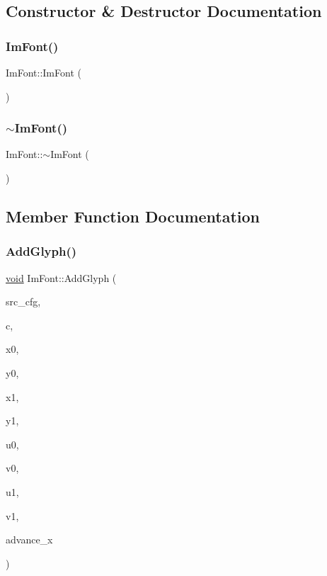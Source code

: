 \subsection{Constructor \& Destructor Documentation}
\mbox{\label{structImFont_a1d35b1eb7c2f6a3a648308531e88e7f1}} 
\subsubsection{\texorpdfstring{Im\+Font()}{ImFont()}}
{\footnotesize\ttfamily Im\+Font\+::\+Im\+Font (\begin{DoxyParamCaption}{ }\end{DoxyParamCaption})}

\mbox{\label{structImFont_a377366ed7c5d076363ad4760aeff63ec}} 
\subsubsection{\texorpdfstring{$\sim$\+Im\+Font()}{~ImFont()}}
{\footnotesize\ttfamily Im\+Font\+::$\sim$\+Im\+Font (\begin{DoxyParamCaption}{ }\end{DoxyParamCaption})}



\subsection{Member Function Documentation}
\mbox{\label{structImFont_a1badad96fa8d41b4754fc7bdb826e6b2}} 
\subsubsection{\texorpdfstring{Add\+Glyph()}{AddGlyph()}}
{\footnotesize\ttfamily \hyperlink{imgui__impl__opengl3__loader_8h_ac668e7cffd9e2e9cfee428b9b2f34fa7}{void} Im\+Font\+::\+Add\+Glyph (\begin{DoxyParamCaption}\item[{const \hyperlink{structImFontConfig}{Im\+Font\+Config} $\ast$}]{src\+\_\+cfg,  }\item[{Im\+Wchar}]{c,  }\item[{float}]{x0,  }\item[{float}]{y0,  }\item[{float}]{x1,  }\item[{float}]{y1,  }\item[{float}]{u0,  }\item[{float}]{v0,  }\item[{float}]{u1,  }\item[{float}]{v1,  }\item[{float}]{advance\+\_\+x }\end{DoxyParamCaption})}

